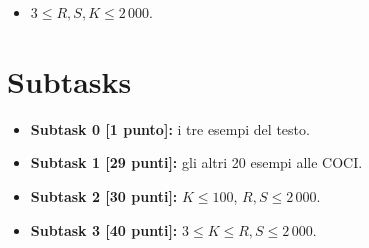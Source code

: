 
\begin{itemize}[nolistsep, noitemsep]
  \item $3 \le R,S,K \le 2\,000$.
\end{itemize}

  \section*{Subtasks}
  \begin{itemize}
    \item \textbf{Subtask 0 [1 punto]:} i tre esempi del testo.
    \item \textbf{Subtask 1 [29 punti]:} gli altri 20 esempi alle COCI.
    \item \textbf{Subtask 2 [30 punti]:} $K \le 100$, $R,S  \le 2\,000$.
    \item \textbf{Subtask 3 [40 punti]:} $3 \le K \le R,S  \le 2\,000$.
  \end{itemize}
  
